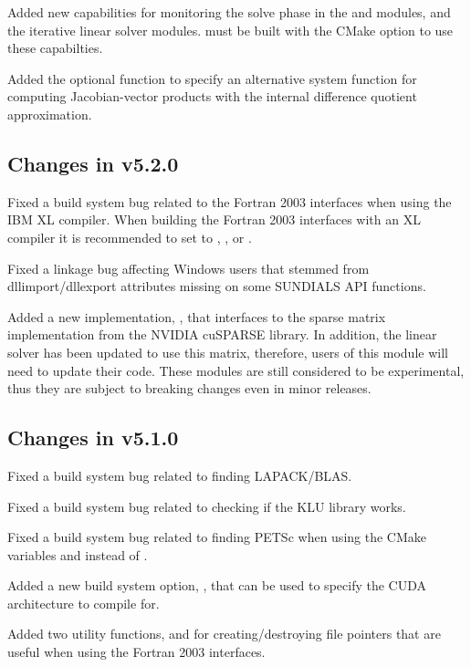 Added new capabilities for monitoring the solve phase in the {\sunnonlinsolnewton}
and {\sunnonlinsolfixedpoint} modules, and the {\sundials} iterative linear solver
modules. {\sundials} must be built with the CMake option
 to use these capabilties.

Added the optional function  to specify an
alternative system function for computing Jacobian-vector products with the
internal difference quotient approximation.

\subsection*{Changes in v5.2.0}

Fixed a build system bug related to the Fortran 2003 interfaces when using the
IBM XL compiler. When building the Fortran 2003 interfaces with an XL compiler
it is recommended to set  to ,
, or .

Fixed a linkage bug affecting Windows users that stemmed from dllimport/dllexport
attributes missing on some SUNDIALS API functions.

Added a new  implementation, , that interfaces
to the sparse matrix implementation from the NVIDIA cuSPARSE library. In addition,
the  linear solver has been updated to
use this matrix, therefore, users of this module will need to update their code.
These modules are still considered to be experimental, thus they are subject to
breaking changes even in minor releases.

\subsection*{Changes in v5.1.0}

Fixed a build system bug related to finding LAPACK/BLAS.

Fixed a build system bug related to checking if the KLU library works.

Fixed a build system bug related to finding PETSc when using the CMake
variables  and  instead of
.

Added a new build system option, , that can be used to specify
the CUDA architecture to compile for.

Added two utility functions,  and 
for creating/destroying file pointers that are useful when using the Fortran
2003 interfaces.

